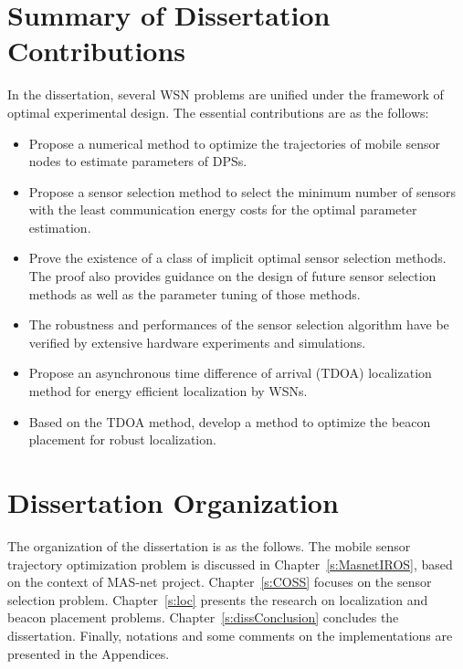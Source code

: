 \section{Summary of Dissertation Contributions}
In the dissertation, several WSN problems are unified under the  framework of optimal experimental design. The essential contributions are as the follows:
\begin{itemize}
  \item Propose a numerical method to optimize the trajectories of mobile sensor nodes to estimate parameters of DPSs.
  \item Propose a sensor selection method to select the minimum number of sensors with the least communication energy costs for the optimal parameter estimation.
  \item Prove the existence of a class of implicit optimal sensor selection methods. The proof also provides guidance on the design of future sensor selection methods as well as the parameter tuning of those methods.
  \item The robustness and performances of the sensor selection algorithm have be verified by extensive hardware experiments and simulations.
  \item Propose an asynchronous time difference of arrival (TDOA) localization method for energy efficient localization by WSNs.
  \item Based on the TDOA method, develop a method to optimize the beacon placement for robust localization.
\end{itemize}

\section{Dissertation Organization}
The organization of the dissertation is as the follows. The mobile sensor trajectory optimization problem is discussed in Chapter~\ref{s:MasnetIROS}, based on the context of MAS-net project. Chapter~\ref{s:COSS} focuses on the sensor selection problem. Chapter~\ref{s:loc} presents the research on localization and beacon placement problems. Chapter~\ref{s:dissConclusion} concludes the dissertation. Finally, notations and some comments on the implementations are presented in the Appendices.